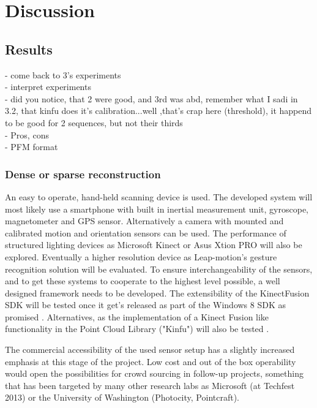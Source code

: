 \documentclass{ucl_thesis}
\begin{document}
\chapter{Discussion} 
\label{chp:discussion}

\section{Results}
\label{sec:discussion_results}

    - come back to 3's experiments\\
    - interpret experiments\\
    - did you notice, that 2 were good, and 3rd was abd, remember what I sadi in 3.2, that kinfu does it's calibration...well ,that's crap here (threshold), it happend to be good for 2 sequences, but not their thirds \\
-     Pros, cons \\
- PFM format \\

\subsection{Dense or sparse reconstruction}

\par An easy to operate, hand-held scanning device is used. The developed system will most likely use a smartphone with built in inertial measurement unit, gyroscope, magnetometer and GPS sensor. Alternatively a camera with mounted and calibrated motion and orientation sensors can be used. The performance of structured lighting devices as Microsoft Kinect \cite{Kinect} or Asus Xtion PRO \cite{XtionPro} will also be explored. Eventually a higher resolution device as Leap-motion's gesture recognition solution \cite{LeapMotion} will be evaluated. To ensure interchangeability of the sensors, and to get these systems to cooperate to the highest level possible, a well designed framework needs to be developed. The extensibility of the KinectFusion SDK will be tested once it get's released as part of the Windows 8 SDK as promised \cite{SDKKinectFusion}. Alternatives, as the implementation of a Kinect Fusion like functionality in the Point Cloud Library ("Kinfu") will also be tested \cite{KinFu}.
\par The commercial accessibility of the used sensor setup has a slightly increased emphasis at this stage of the project. Low cost and out of the box operability would open the possibilities for crowd sourcing in follow-up projects, something that has been targeted by many other research labs as Microsoft (at Techfest 2013) or the University of Washington (Photocity, Pointcraft).
\end{document}
